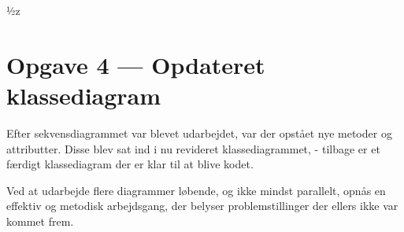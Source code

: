 ½z\section{Opgave 4 --- Opdateret klassediagram}
Efter sekvensdiagrammet var blevet udarbejdet, var der opstået nye metoder og attributter. Disse blev sat ind i nu revideret klassediagrammet,  - tilbage er et færdigt klassediagram der er klar til at blive kodet.

Ved at udarbejde flere diagrammer løbende, og ikke mindst parallelt, opnås en effektiv og metodisk arbejdsgang, der belyser problemstillinger der ellers ikke var kommet frem.